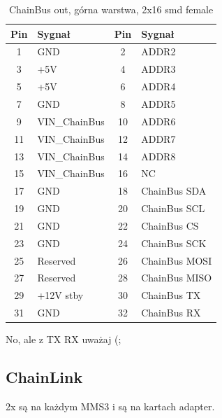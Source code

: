 \documentclass[b5paper, 10pt, twoside]{book}
\begin{document}
\begin{table}[H]
  \centering
  \caption{ChainBus out, górna warstwa, 2x16 smd female}
  \small
  \begin{tabular}{@{}cl|cl@{}}
    \toprule
    \textbf{Pin} & \textbf{Sygnał} & \textbf{Pin} & \textbf{Sygnał} \\ \midrule
    1            & GND             & 2            & ADDR2           \\
    3            & +5V             & 4            & ADDR3           \\
    5            & +5V             & 6            & ADDR4           \\
    7            & GND             & 8            & ADDR5           \\
    9            & VIN\_ChainBus   & 10           & ADDR6           \\
    11           & VIN\_ChainBus   & 12           & ADDR7           \\
    13           & VIN\_ChainBus   & 14           & ADDR8           \\
    15           & VIN\_ChainBus   & 16           & NC              \\
    17           & GND             & 18           & ChainBus SDA    \\
    19           & GND             & 20           & ChainBus SCL    \\
    21           & GND             & 22           & ChainBus CS     \\
    23           & GND             & 24           & ChainBus SCK    \\
    25           & Reserved         & 26           & ChainBus MOSI   \\
    27           & Reserved        & 28           & ChainBus MISO   \\
    29           & +12V stby       & 30           & ChainBus TX     \\
    31           & GND             & 32           & ChainBus RX     \\ \bottomrule
  \end{tabular}
\end{table}

No, ale z TX RX uważaj (;

\subsection{ChainLink}
2x są na każdym MMS3 i są na kartach adapter.
\end{document}
